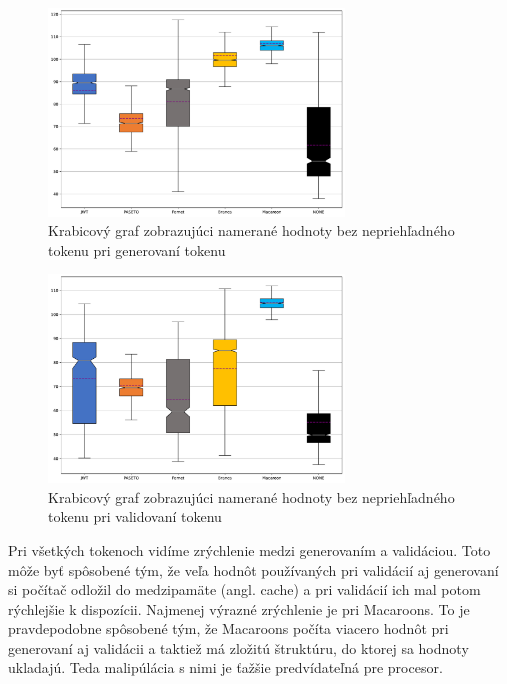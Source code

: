 \begin{figure}
  \centerline{\includegraphics[width=0.7\textwidth]{images/signin_boxplot_without_opaque}}
  \caption[Krabicový graf -- generovanie, hodnoty bez nepriehľadného tokenu]{Krabicový graf zobrazujúci namerané hodnoty bez nepriehľadného tokenu pri generovaní tokenu}
  \label{fig:signin_boxplot_without_opaque}
\end{figure}

\begin{figure}
  \centerline{\includegraphics[width=0.7\textwidth]{images/request_boxplot_without_opaque}}
  \caption[Krabicový graf -- validácia, hodnoty bez nepriehľadného tokenu]{Krabicový graf zobrazujúci namerané hodnoty bez nepriehľadného tokenu pri validovaní tokenu}
  \label{fig:request_boxplot_without_opaque}
\end{figure}

Pri všetkých tokenoch vidíme zrýchlenie medzi generovaním a validáciou. Toto môže byť spôsobené tým, že veľa hodnôt používaných pri validácií aj generovaní si počítač odložil do medzipamäte (angl. cache) a pri validácií ich mal potom rýchlejšie k dispozícii. Najmenej výrazné zrýchlenie je pri Macaroons. To je pravdepodobne spôsobené tým, že Macaroons počíta viacero hodnôt pri generovaní aj validácii a taktiež má zložitú štruktúru, do ktorej sa hodnoty ukladajú. Teda malipúlácia s nimi je ťažšie predvídateľná pre procesor.


